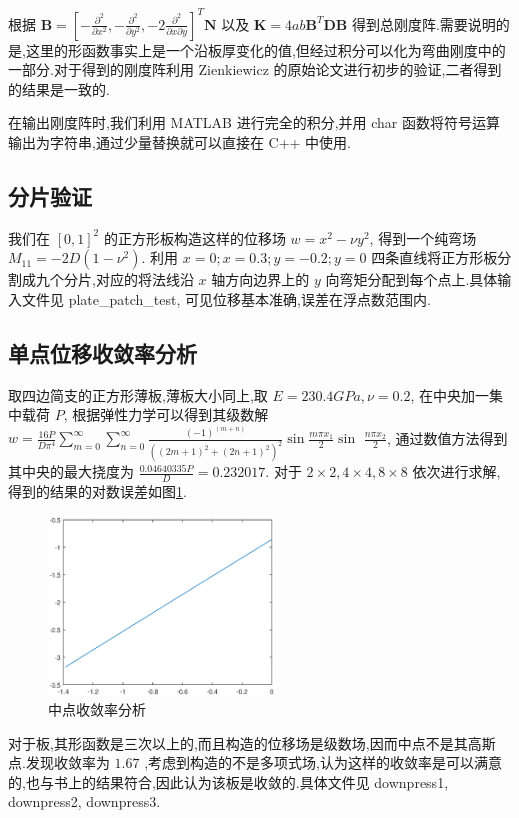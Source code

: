 根据 $\mathbf{B}=[-\frac{\partial^2}{\partial x^2},-\frac{\partial^2}{\partial y^2},-2\frac{\partial^2}{\partial x \partial y}]^T\mathbf{N}$ 以及 $\mathbf{K}=4ab\mathbf{B}^T\mathbf{D}\mathbf{B}$ 得到总刚度阵.需要说明的是,这里的形函数事实上是一个沿板厚变化的值,但经过积分可以化为弯曲刚度中的一部分.对于得到的刚度阵利用 Zienkiewicz 的原始论文进行初步的验证,二者得到的结果是一致的.

在输出刚度阵时,我们利用 MATLAB 进行完全的积分,并用 char 函数将符号运算输出为字符串,通过少量替换就可以直接在 C++ 中使用.

\subsection{分片验证}

我们在 $[0,1]^2$ 的正方形板构造这样的位移场 $w=x^2-\nu y^2$, 得到一个纯弯场 $M_{11}=-2D(1-\nu^2)$. 利用 $x=0;x=0.3;y=-0.2;y=0$ 四条直线将正方形板分割成九个分片,对应的将法线沿 $x$ 轴方向边界上的 $y$ 向弯矩分配到每个点上.具体输入文件见 plate\_patch\_test, 可见位移基本准确,误差在浮点数范围内.

\subsection{单点位移收敛率分析}

取四边简支的正方形薄板,薄板大小同上,取 $E=230.4GPa,\nu=0.2$, 在中央加一集中载荷 $P$, 根据弹性力学可以得到其级数解 $w=\frac{16P}{D\pi^4}\sum\limits_{m=0}^{\infty}\sum\limits_{n=0}^{\infty} \frac{(-1)^(m+n)}{((2m+1)^2+(2n+1)^2)^2}\sin\frac{m\pi x_1}{2}\sin$ $\frac{n\pi x_2}{2}$, 通过数值方法得到其中央的最大挠度为 $\frac{0.04640335P}{D}=0.232017$. 对于 $2\times 2,4\times 4,8\times 8$ 依次进行求解,得到的结果的对数误差如图\ref{platecvg}.

\begin{figure}[htbp]
  \centering
  \includegraphics[width=6cm]{plateconvergence}
  \caption{中点收敛率分析}
  \label{platecvg}
\end{figure}
对于板,其形函数是三次以上的,而且构造的位移场是级数场,因而中点不是其高斯点.发现收敛率为 $1.67$ ,考虑到构造的不是多项式场,认为这样的收敛率是可以满意的,也与书上的结果符合,因此认为该板是收敛的.具体文件见 downpress1, downpress2, downpress3.


